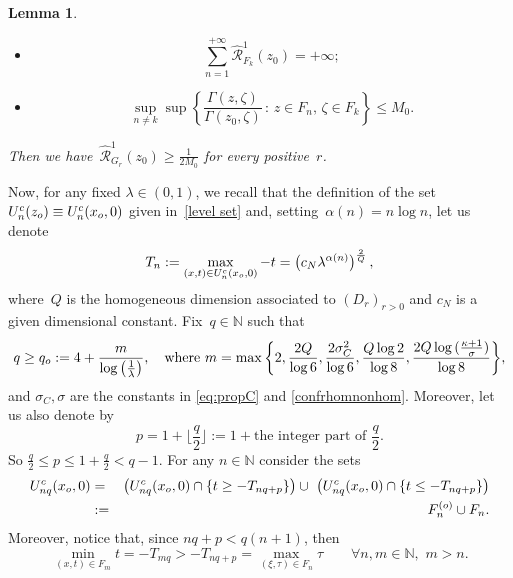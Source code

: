\documentclass{amsart}
\newtheorem{lemma}[thm]{Lemma}
\numberwithin{equation}{section}
\def \balayage{{\widehat{\mathcal{R}}}}
\renewcommand{\Gamma}{\varGamma}
\begin{document}
{\begin{lemma}
\begin{itemize}
\item[($i$)]$$\sum_{n=1}^{+\infty}{\balayage^1_{F_k}(z_0)}=+\infty;$$
\item[($ii$)]$$\sup_{n\neq k}\sup{\left\{\frac{\Gamma(z,\zeta)}{\Gamma(z_0,\zeta)}\,:\,z\in F_n,\,\zeta\in F_k\right\}}\leq M_0.$$
\end{itemize}
Then we have~$\balayage^1_{G_r}(z_0)\geq \frac{1}{2M_0}$ for every positive~$r$.
\end{lemma}

 Now, for any fixed $\lambda\in(0,1)$, we recall that the definition of the set $U_n^c(z_{\rm o}) \equiv U_n^c(x_{\rm o},0)$ given in~\eqref{level set} and, setting~$\alpha(n)=n\log{n}$, let us  denote
\[
T_n :=\max_{(x,t)\in U_n^c(x_{\rm o},0)}  - t = \big(c_N \lambda^{\alpha(n)} \big)^\frac{2}{Q}\,,
\]
where~$Q$ is the homogeneous dimension associated to $(D_r)_{r>0}$ and $c_N$ is a given dimensional constant. Fix~$q\in\mathbb{N}$ such that 
  \begin{equation}\label{def:q}
  q\geq q_{\rm o}:=4+\frac{m}{\log{\left(\frac{1}{\lambda}\right)}},\quad\mbox{where }m=
  \max{\left\{2,\frac{2Q}{\log{6}},\frac{2\sigma_C^2}{\log{6}},\frac{Q\log{2}}{\log{8}},\frac{2Q\log{(\frac{\kappa+1}{\sigma})}}{\log{8}}\right\}},
  \end{equation}
 and $\sigma_C, \sigma$ are the constants in \eqref{eq:propC} and \eqref{confrhomnonhom}. Moreover, let us also denote by
 \begin{equation}\label{eq:choice-p}
 p=1+\Big\lfloor\frac{q}{2}\Big\rfloor :=1+\mbox{the integer part of }\frac{q}{2}.
 \end{equation}
 So $\frac{q}{2}\leq p\leq 1 + \frac{q}{2} <q-1$. 
 For any $n\in\mathbb{N}$  consider the sets
 \begin{eqnarray*}
 U_{nq}^c(x_{\rm o},0) & = & \big( U_{nq}^c(x_{\rm o},0)\cap \{t \geq -T_{nq+p}\}\big) \cup \ \big(U_{nq}^c(x_{\rm o},0)\cap \{t \leq -T_{nq+p}\}\big)\\
 & : = & F_n^{( {\rm o})}\cup F_n.
 \end{eqnarray*} 
 Moreover, notice that, since $nq+p<q(n+1)$, then
  \begin{equation}\label{eq:ordine}
  \min_{(x,t)\in F_{m}}{t}=-T_{mq}>-T_{nq+p}=\max_{(\xi,\tau)\in F_{n}}{\tau}\qquad\forall n,m\in\mathbb{N},\,\,m>n.
  \end{equation}
 
}
\end{document}

